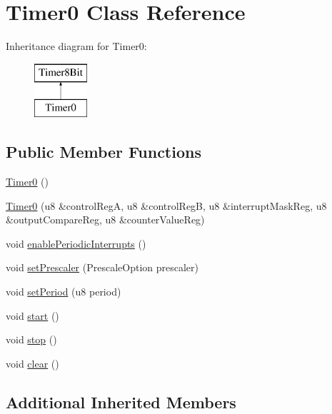 \hypertarget{class_timer0}{}\section{Timer0 Class Reference}
\label{class_timer0}
Inheritance diagram for Timer0\+:\begin{figure}[H]
\begin{center}
\leavevmode
\includegraphics[height=2.000000cm]{class_timer0}
\end{center}
\end{figure}
\subsection*{Public Member Functions}
\begin{DoxyCompactItemize}
\item 
\mbox{\hyperlink{class_timer0_a660c8150e1d5462c7e0cd5b5f173bf5a}{Timer0}} ()
\item 
\mbox{\hyperlink{class_timer0_add6e98a4cf3fcecfe8f2e9372414fbd5}{Timer0}} (u8 \&control\+RegA, u8 \&control\+RegB, u8 \&interrupt\+Mask\+Reg, u8 \&output\+Compare\+Reg, u8 \&counter\+Value\+Reg)
\item 
void \mbox{\hyperlink{class_timer0_a8f0117cda8e82867d58725cf76a73686}{enable\+Periodic\+Interrupts}} ()
\item 
void \mbox{\hyperlink{class_timer0_aaa42d8cd37a0f9f37d42bd4f1f6c91f8}{set\+Prescaler}} (Prescale\+Option prescaler)
\item 
void \mbox{\hyperlink{class_timer0_af19c7f55137a551a3e9ae1c6b15fd4c5}{set\+Period}} (u8 period)
\item 
void \mbox{\hyperlink{class_timer0_a8294e4507ea1b68e090ea77a847257c2}{start}} ()
\item 
void \mbox{\hyperlink{class_timer0_a423cccd0c305d4e552de970b7e71fd0b}{stop}} ()
\item 
void \mbox{\hyperlink{class_timer0_a28a4702cf58fd3cf39ae01e092c0d372}{clear}} ()
\end{DoxyCompactItemize}
\subsection*{Additional Inherited Members}


